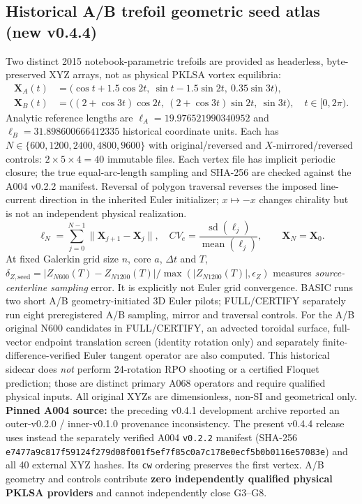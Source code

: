 \documentclass[11pt,a4paper]{article}
\begin{document}
\subsection*{Historical A/B trefoil geometric seed atlas (new v0.4.4)}
Two distinct 2015 notebook-parametric trefoils are provided as headerless,
byte-preserved XYZ arrays, not as physical PKLSA vortex equilibria:
\begin{align}
\mathbf X_A(t)&=\bigl(\cos t+1.5\cos2t,\ \sin t-1.5\sin2t,\ 0.35\sin3t\bigr),\\
\mathbf X_B(t)&=\bigl((2+\cos3t)\cos2t,\ (2+\cos3t)\sin2t,\ \sin3t\bigr),\quad t\in[0,2\pi).
\end{align}
Analytic reference lengths are $\ell_A=19.976521990340952$ and
$\ell_B=31.898600666412335$ historical coordinate units. Each has
$N\in\{600,1200,2400,4800,9600\}$ with original/reversed and
$X$-mirrored/reversed controls: $2\times5\times4=40$ immutable files.
Each vertex file has implicit periodic closure; the true equal-arc-length
sampling and SHA-256 are checked against the A004 v0.2.2 manifest. Reversal
of polygon traversal reverses the imposed line-current direction in the
inherited Euler initializer; $x\mapsto-x$ changes chirality but is not
an independent physical realization.
\begin{equation}
 \ell_N=\sum_{j=0}^{N-1}\|\mathbf X_{j+1}-\mathbf X_j\|,\quad
 CV_e=\frac{\operatorname{sd}(\ell_j)}{\operatorname{mean}(\ell_j)},
 \qquad \mathbf X_N=\mathbf X_0.
\end{equation}
At fixed Galerkin grid size $n$, core $a$, $\Delta t$ and $T$,
$\delta_{Z,\mathrm{seed}}=|Z_{N600}(T)-Z_{N1200}(T)|/
\max(|Z_{N1200}(T)|,\epsilon_Z)$ measures \emph{source-centerline sampling}
error. It is explicitly not Euler grid convergence. BASIC runs two short A/B geometry-initiated 3D Euler pilots;
FULL/CERTIFY separately run eight preregistered A/B sampling,
mirror and traversal controls. For the A/B original N600 candidates
in FULL/CERTIFY, an advected toroidal surface, full-vector endpoint
translation screen (identity rotation only) and separately
finite-difference-verified Euler tangent operator are also computed.
This historical sidecar does \emph{not} perform 24-rotation RPO
shooting or a certified Floquet prediction; those are distinct
primary A068 operators and require qualified physical inputs.
All original XYZs are dimensionless, non-SI and geometrical only.
\textbf{Pinned A004 source:} the preceding v0.4.1 development archive
reported an outer-v0.2.0 / inner-v0.1.0 provenance inconsistency.
The present v0.4.4 release uses instead the separately verified A004
\texttt{v0.2.2} manifest (SHA-256
\texttt{e7477a9c817f59124f279d08f001f5ef7f85c0a7c178e0ecf5b0b0116e57083e})
and all 40 external XYZ hashes. Its \texttt{cw} ordering preserves the
first vertex. A/B geometry and controls contribute \textbf{zero independently
qualified physical PKLSA providers} and cannot independently close G3--G8.
\end{document}

